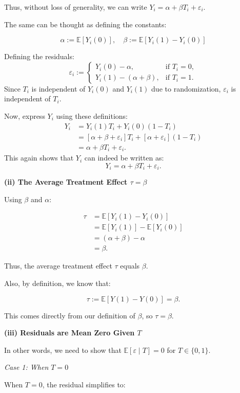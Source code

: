 \documentclass{article}
\begin{document}
Thus, without loss of generality, we can write \(Y_i = \alpha + \beta T_i + \varepsilon_i\).

The same can be thought as defining the constants:

\[
\alpha := \mathbb{E}[Y_i(0)], \quad \beta := \mathbb{E}[Y_i(1) - Y_i(0)]
\]

Defining the residuals:
\[
\varepsilon_i := \begin{cases}
Y_i(0) - \alpha, & \text{if } T_i = 0, \\
Y_i(1) - (\alpha + \beta), & \text{if } T_i = 1.
\end{cases}
\]
Since \(T_i\) is independent of \(Y_i(0)\) and \(Y_i(1)\) due to randomization, \(\varepsilon_i\) is independent of \(T_i\).

Now, express \(Y_i\) using these definitions:
\begin{align*}
Y_i &= Y_i(1) T_i + Y_i(0)(1 - T_i) \\
&= [\alpha + \beta + \varepsilon_i] T_i + [\alpha + \varepsilon_i](1 - T_i) \\
&= \alpha + \beta T_i + \varepsilon_i.
\end{align*}
This again shows that \(Y_i\) can indeed be written as:
\[
Y_i = \alpha + \beta T_i + \varepsilon_i.
\]

\textbf{(ii) The Average Treatment Effect \(\tau = \beta\)}

Using \(\beta\) and \(\alpha\):

\begin{align*}
\tau &= \mathbb{E}[Y_i(1) - Y_i(0)] \\
&= \mathbb{E}[Y_i(1)] - \mathbb{E}[Y_i(0)] \\
&= (\alpha + \beta) - \alpha \\
&= \beta.
\end{align*}

Thus, the average treatment effect \(\tau\) equals \(\beta\).

Also, by definition, we know that:

\[
\tau := \mathbb{E}[Y(1) - Y(0)] = \beta.
\]

This comes directly from our definition of \(\beta\), so \(\tau = \beta\).

\textbf{(iii) Residuals are Mean Zero Given \(T\)}

In other words, we need to show that \(\mathbb{E}[\varepsilon \mid T] = 0\) for \(T \in \{0, 1\}\).

\textit{Case 1: When \(T = 0\)}

When \(T = 0\), the residual simplifies to:
\end{document}
